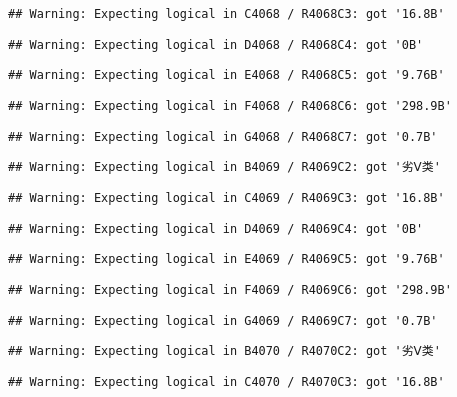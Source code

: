 \documentclass[
]{article}
\begin{document}
\begin{verbatim}
## Warning: Expecting logical in C4068 / R4068C3: got '16.8B'
\end{verbatim}

\begin{verbatim}
## Warning: Expecting logical in D4068 / R4068C4: got '0B'
\end{verbatim}

\begin{verbatim}
## Warning: Expecting logical in E4068 / R4068C5: got '9.76B'
\end{verbatim}

\begin{verbatim}
## Warning: Expecting logical in F4068 / R4068C6: got '298.9B'
\end{verbatim}

\begin{verbatim}
## Warning: Expecting logical in G4068 / R4068C7: got '0.7B'
\end{verbatim}

\begin{verbatim}
## Warning: Expecting logical in B4069 / R4069C2: got '劣Ⅴ类'
\end{verbatim}

\begin{verbatim}
## Warning: Expecting logical in C4069 / R4069C3: got '16.8B'
\end{verbatim}

\begin{verbatim}
## Warning: Expecting logical in D4069 / R4069C4: got '0B'
\end{verbatim}

\begin{verbatim}
## Warning: Expecting logical in E4069 / R4069C5: got '9.76B'
\end{verbatim}

\begin{verbatim}
## Warning: Expecting logical in F4069 / R4069C6: got '298.9B'
\end{verbatim}

\begin{verbatim}
## Warning: Expecting logical in G4069 / R4069C7: got '0.7B'
\end{verbatim}

\begin{verbatim}
## Warning: Expecting logical in B4070 / R4070C2: got '劣Ⅴ类'
\end{verbatim}

\begin{verbatim}
## Warning: Expecting logical in C4070 / R4070C3: got '16.8B'
\end{verbatim}
\end{document}
